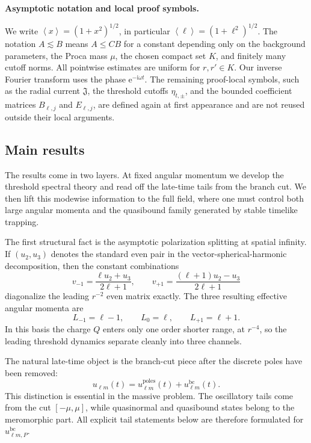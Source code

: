 \documentclass[12pt]{article}
\numberwithin{equation}{section}
\theoremstyle{plain}
\theoremstyle{definition}
\theoremstyle{remark}
\newcommand{\ii}{\mathrm i}
\newcommand{\ee}{\mathrm e}
\newcommand{\bc}{\mathrm{bc}}
\newcommand{\om}{\omega}
\newcommand{\angles}[1]{\left\langle #1 \right\rangle}
\begin{document}
\medskip\noindent\textbf{Asymptotic notation and local proof symbols.}\par\smallskip\noindent
We write $\angles{x}=(1+x^2)^{1/2}$, in particular $\angles{\ell}=(1+\ell^2)^{1/2}$.  The notation $A\lesssim B$ means $A\le CB$ for a constant depending only on the background parameters, the Proca mass $\mu$, the chosen compact set $K$, and finitely many cutoff norms.  All pointwise estimates are uniform for $r,r'\in K$.  Our inverse Fourier transform uses the phase $\ee^{-\ii\om t}$.  The remaining proof-local symbols, such as the radial current $\mathfrak J$, the threshold cutoffs $\eta_{t,\pm}$, and the bounded coefficient matrices $B_{\ell,j}$ and $E_{\ell,j}$, are defined again at first appearance and are not reused outside their local arguments.




\subsection{Main results}

The results come in two layers.  At fixed angular momentum we develop the threshold spectral theory and read off the late-time tails from the branch cut.  We then lift this modewise information to the full field, where one must control both large angular momenta and the quasibound family generated by stable timelike trapping.

The first structural fact is the asymptotic polarization splitting at spatial infinity.  If $(u_2,u_3)$ denotes the standard even pair in the vector-spherical-harmonic decomposition, then the constant combinations
\begin{equation}\label{eq:intro_even_pol_basis}
   v_{-1}=\frac{\ell u_2+u_3}{2\ell+1},
   \qquad
   v_{+1}=\frac{(\ell+1)u_2-u_3}{2\ell+1}
\end{equation}
diagonalize the leading $r^{-2}$ even matrix exactly.  The three resulting effective angular momenta are
\begin{equation}\label{eq:intro_Lvalues}
   L_{-1}=\ell-1,
   \qquad
   L_0=\ell,
   \qquad
   L_{+1}=\ell+1.
\end{equation}
In this basis the charge $Q$ enters only one order shorter range, at $r^{-4}$, so the leading threshold dynamics separate cleanly into three channels.

The natural late-time object is the branch-cut piece after the discrete poles have been removed:
\[
   u_{\ell m}(t)=u^{\mathrm{poles}}_{\ell m}(t)+u^{\bc}_{\ell m}(t).
\]
This distinction is essential in the massive problem.  The oscillatory tails come from the cut $[-\mu,\mu]$, while quasinormal and quasibound states belong to the meromorphic part.  All explicit tail statements below are therefore formulated for $u^{\bc}_{\ell m,P}$.
\end{document}
